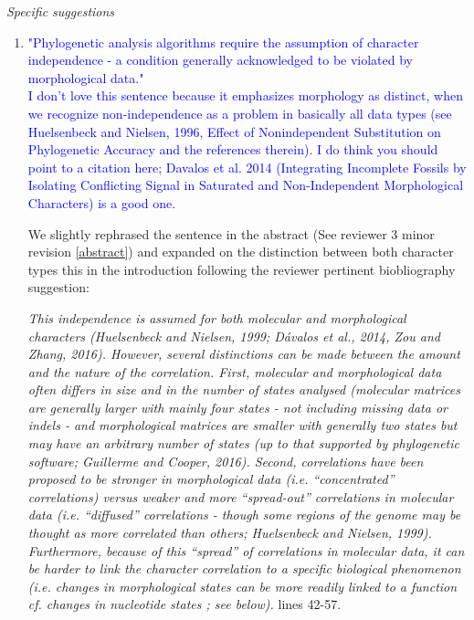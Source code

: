 \documentclass[12pt,letterpaper]{article}
\renewcommand{\subsection}[1]{%
\bigskip
\begin{center}
\begin{large}
\normalfont\itshape #1
\end{large}
\end{center}}
\begin{document}
\subsection{Specific suggestions}

\begin{enumerate}

\item{\textcolor{blue}{"Phylogenetic analysis algorithms require the assumption of character independence - a condition generally acknowledged to be violated by morphological data."\\
I don't love this sentence because it emphasizes morphology as distinct, when we recognize non-independence as a problem in basically all data types (see Huelsenbeck and Nielsen, 1996, Effect of Nonindependent Substitution on Phylogenetic Accuracy and the references therein). I do think you should point to a citation here; Davalos et al. 2014 (Integrating Incomplete Fossils by Isolating Conflicting Signal in Saturated and Non-Independent Morphological Characters) is a good one.}}
\label{molecular}

We slightly rephrased the sentence in the abstract (See reviewer 3 minor revision \ref{abstract}) and expanded on the distinction between both character types this in the introduction following the reviewer pertinent biobliography suggestion:

\textit{This independence is assumed for both molecular and morphological characters (Huelsenbeck and Nielsen, 1999; D\'{a}valos et al., 2014, Zou and Zhang, 2016).
However, several distinctions can be made between the amount and the nature of the correlation.
First, molecular and morphological data often differs in size and in the number of states analysed (molecular matrices are generally larger with mainly four states - not including missing data or indels - and morphological matrices are smaller with generally two states but may have an arbitrary number of states (up to that supported by phylogenetic software; Guillerme and Cooper, 2016).
Second, correlations have been proposed to be stronger in morphological data (i.e. ``concentrated'' correlations) \textit{versus} weaker and more ``spread-out'' correlations in molecular data (i.e. ``diffused'' correlations - though some regions of the genome may be thought as more correlated than others; Huelsenbeck and Nielsen, 1999).
Furthermore, because of this ``spread'' of correlations in molecular data, it can be harder to link the character correlation to a specific biological phenomenon (i.e. changes in morphological states can be more readily linked to a function cf. changes in nucleotide states ; see below).} lines 42-57.


\end{enumerate}
\end{document}

